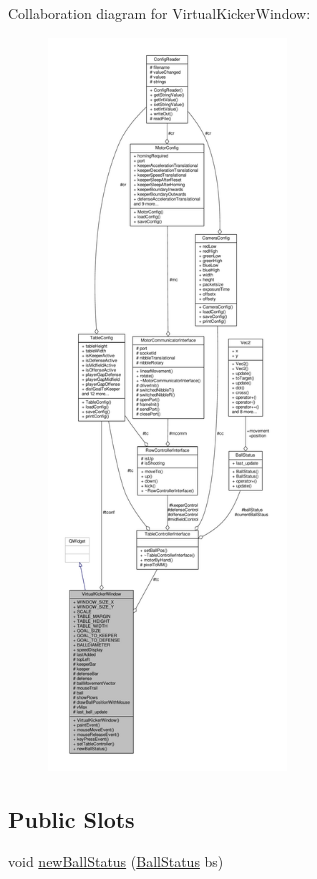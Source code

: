 Collaboration diagram for Virtual\+Kicker\+Window\+:\nopagebreak
\begin{figure}[H]
\begin{center}
\leavevmode
\includegraphics[height=550pt]{class_virtual_kicker_window__coll__graph}
\end{center}
\end{figure}
\subsection*{Public Slots}
\begin{DoxyCompactItemize}
\item 
void \hyperlink{class_virtual_kicker_window_a33c23d35502f7c82ab6f75f61280a876}{new\+Ball\+Status} (\hyperlink{class_ball_status}{Ball\+Status} bs)
\end{DoxyCompactItemize}
